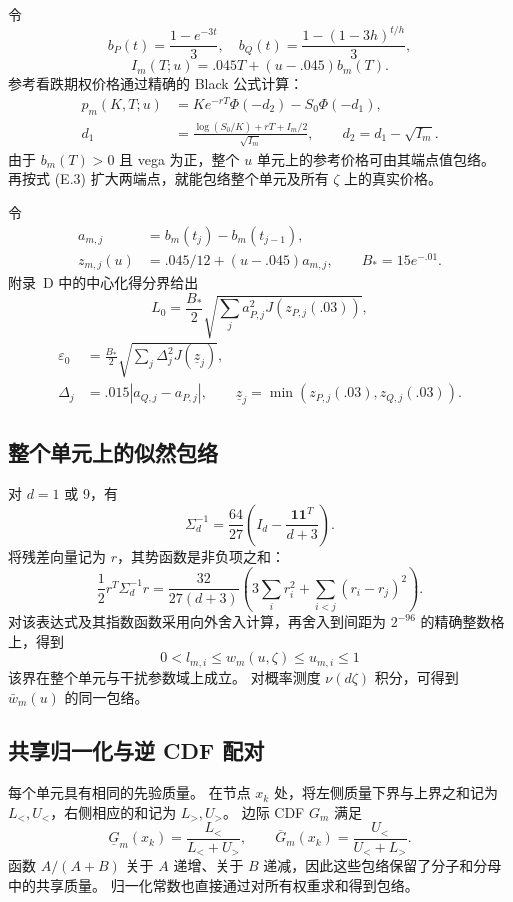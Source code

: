 令
\[
b_P(t)=\frac{1-e^{-3t}}3,\quad
b_Q(t)=\frac{1-(1-3h)^{t/h}}3,
\]
\[
I_m(T;u)=.045T+(u-.045)b_m(T).
\]
参考看跌期权价格通过精确的 Black 公式计算：
\[
\begin{aligned}
p_m(K,T;u)&=Ke^{-rT}\Phi(-d_2)-S_0\Phi(-d_1),\\
d_1&=\frac{\log(S_0/K)+rT+I_m/2}{\sqrt{I_m}},\qquad
d_2=d_1-\sqrt{I_m}.
\end{aligned}
\tag{F.2}
\]
由于 \(b_m(T)>0\) 且 vega 为正，整个 \(u\) 单元上的参考价格可由其端点值包络。
再按式 (E.3) 扩大两端点，就能包络整个单元及所有 \(\zeta\) 上的真实价格。

令
\[
\begin{aligned}
a_{m,j}&=b_m(t_j)-b_m(t_{j-1}),\\
z_{m,j}(u)&=.045/12+(u-.045)a_{m,j},\qquad B_*=15e^{-.01}.
\end{aligned}
\]
附录~D 中的中心化得分界给出
\[
L_0=\frac{B_*}2
\sqrt{\sum_ja_{P,j}^2J(z_{P,j}(.03))},
\]
\[
\begin{aligned}
\varepsilon_0&=\frac{B_*}2
\sqrt{\sum_j\Delta_j^2J(\underline z_j)},\\
\Delta_j&=.015|a_{Q,j}-a_{P,j}|,\qquad
\underline z_j=\min(z_{P,j}(.03),z_{Q,j}(.03)).
\end{aligned}
\tag{F.3}
\]

\subsection{整个单元上的似然包络}

对 \(d=1\) 或 9，有
\[
\Sigma_d^{-1}=\frac{64}{27}\left(I_d-\frac{\mathbf1\mathbf1^T}{d+3}\right).
\]
将残差向量记为 \(r\)，其势函数是非负项之和：
\[
\frac12r^T\Sigma_d^{-1}r=
\frac{32}{27(d+3)}
\left(3\sum_i r_i^2+\sum_{i<j}(r_i-r_j)^2\right).
\tag{F.4}
\]
对该表达式及其指数函数采用向外舍入计算，再舍入到间距为 \(2^{-96}\) 的精确整数格上，得到
\[
0<l_{m,i}\le w_m(u,\zeta)\le u_{m,i}\le1
\]
该界在整个单元与干扰参数域上成立。
对概率测度 \(\nu(d\zeta)\) 积分，可得到 \(\bar w_m(u)\) 的同一包络。

\subsection{共享归一化与逆 CDF 配对}

每个单元具有相同的先验质量。
在节点 \(x_k\) 处，将左侧质量下界与上界之和记为
\(L_<,U_<\)，右侧相应的和记为 \(L_>,U_>\)。
边际 CDF \(G_m\) 满足
\[
\underline G_m(x_k)=\frac{L_<}{L_<+U_>},
\qquad
\overline G_m(x_k)=\frac{U_<}{U_<+L_>}.
\tag{F.5}
\]
函数 \(A/(A+B)\) 关于 \(A\) 递增、关于 \(B\) 递减，因此这些包络保留了分子和分母中的共享质量。
归一化常数也直接通过对所有权重求和得到包络。

